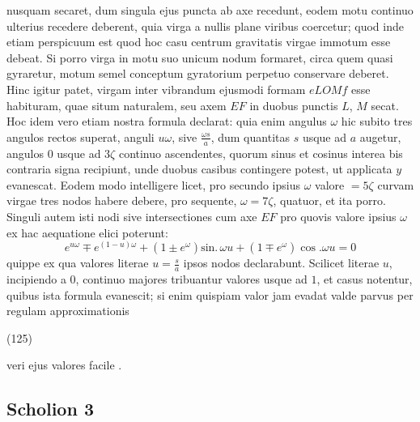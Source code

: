 \documentclass[11pt,a4paper]{article}
\begin{document}
nusquam secaret, dum singula ejus puncta ab axe recedunt, eodem motu continuo
ulterius recedere deberent, quia virga a nullis plane viribus coercetur; quod inde
etiam perspicuum est quod hoc casu centrum gravitatis virgae immotum esse debeat.
Si porro virga in motu suo unicum nodum formaret, circa quem quasi gyraretur,
motum semel conceptum gyratorium perpetuo conservare deberet. Hinc igitur patet,
virgam inter vibrandum ejusmodi formam $eLOMf$ esse habituram,
quae situm naturalem, seu axem $EF$ in duobus punctis $L$, $M$ secat. Hoc idem vero
etiam nostra formula declarat: quia enim angulus $\omega$ hic subito tres angulos
rectos superat, anguli $u\omega$, sive $\frac{\omega s}{a}$, dum quantitas $s$ usque
ad $a$ augetur, angulos  $0$ usque ad $3\zeta$ continuo
ascendentes, quorum sinus et cosinus interea bis contraria signa recipiunt, unde
duobus casibus contingere potest, ut applicata $y$ evanescat. Eodem modo intelligere
licet, pro secundo ipsius $\omega$ valore $= 5\zeta$ curvam virgae tres nodos habere
debere, pro sequente, $\omega = 7\zeta$, quatuor, et ita porro. Singuli autem isti
nodi sive intersectiones cum axe $EF$ pro quovis valore ipsius $\omega$ ex hac
aequatione elici poterunt:
\[
e^{u\omega} \mp e^{(1-u)\omega} + (1 \pm e^\omega)\text{sin.}\,\omega u + (1 \mp e^\omega)\cos.\omega u = 0
\]
quippe ex qua valores literae $u = \frac{s}{a}$ ipsos nodos declarabunt. Scilicet
literae $u$, incipiendo a $0$, continuo majores tribuantur valores usque ad $1$, et
casus notentur, quibus ista formula evanescit; si enim quispiam valor jam evadat
valde parvus per regulam approximationis

(125)

veri ejus valores facile .

\subsection{Scholion 3}
\end{document}
